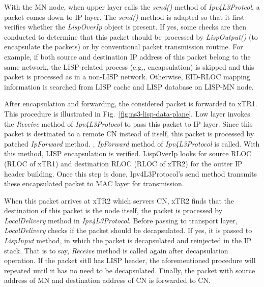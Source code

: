 With the MN node, when upper layer calls the \emph{send()} method of \emph{Ipv4L3Protcol}, a packet comes down to IP layer. The \emph{send()} method is adapted so that    
it first verifies whether the \emph{LispOverIp} object is present. If yes, some checks are then conducted to determine that this packet should be processed by \emph{LispOutput()} (to encapsulate the packets) or by conventional packet transmission routine. For example, if both source and destination IP address of this packet belong to the same network, the LISP-related process (e.g., encapsulation) is skipped and this packet is processed as in a non-LISP network. Otherwise, EID-RLOC mapping information is searched from LISP cache and LISP database on LISP-MN node. 

After encapsulation and forwarding, the considered packet is forwarded to xTR1. This procedure is illustrated in Fig.~\ref{fig:ns3-lisp-data-plane}. Low layer invokes the \emph{Receive} method of \emph{Ipv4L3Protocol} to pass this packet to IP layer. Since this packet is destinated to a remote CN instead of itself, this packet is processed by patched \emph{IpForward} method. , \emph{IpForward} method of \emph{Ipv4L3Protocol} is called. With this method, LISP encapsulation is verified. LispOverIp looks for source RLOC (RLOC of xTR1) and destination RLOC (RLOC of xTR2) for the outter IP header building. Once this step is done, Ipv4L3Protocol's send method transmits these encapsulated packet to MAC layer for transmission.

When this packet arrives at xTR2 which servers CN, xTR2 finds that the destination of this packet is the node itself, the packet is processed by \emph{LocalDelivery} method in \emph{Ipv4L3Protocol}. Before passing to transport layer, \emph{LocalDelivery} checks if the packet should be decapsulated. If yes, it is passed to \emph{LispInput} method, in which the packet is decapsulated and reinjected in the IP stack. That is to say, \emph{Receive} method is called again after decapsulation operation. If the packet sitll has LISP header, the aforementioned procedure will repeated until it has no need to be decapsulated. Finally, the packet with source address of MN and destination address of CN is forwarded to CN.

